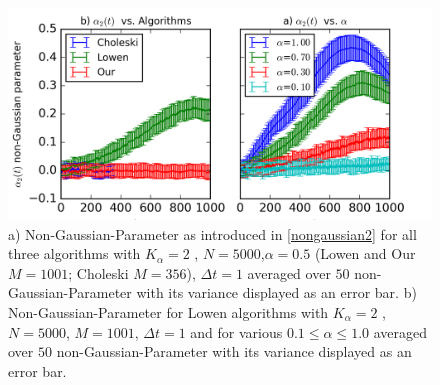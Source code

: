 \documentclass[
  a4paper,BCOR10mm,oneside,
  bibtotoc,idxtotoc,
  headsepline,footsepline,%
  fleqn,openbib
]{scrbook}
\begin{document}
 

\begin{figure}[h!]
\centering
\includegraphics[width=\textwidth]{./data/nongaussianlowenalpha.png}
\caption{a) Non-Gaussian-Parameter as introduced in \cref{nongaussian2} for all three algorithms with $K_{\alpha}=2$ , $N=5000$,$\alpha=0.5$ (Lowen and Our $M=1001$; Choleski $M=356$), $\Delta t = 1$  averaged over $50$ non-Gaussian-Parameter with its variance displayed as an error bar.\newline
b) Non-Gaussian-Parameter for Lowen algorithms with $K_{\alpha}=2$ , $N=5000$, $M=1001$, $\Delta t = 1$ and for various $0.1\leq\alpha\leq1.0$  averaged over $50$ non-Gaussian-Parameter with its variance displayed as an error bar.}
\label{nongaussianlowen}
\end{figure}
\end{document}
